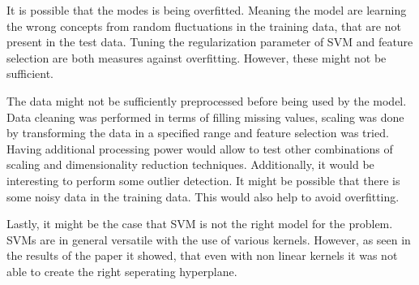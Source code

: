 It is possible that the modes is being overfitted. Meaning the model are learning the wrong concepts from random fluctuations in the training data, that are not present in the test data. Tuning the regularization parameter of SVM and feature selection are both measures against overfitting. However, these might not be sufficient. 

The data might not be sufficiently preprocessed before being used by the model. Data cleaning was performed in terms of filling missing values, scaling was done by transforming the data in a specified range and feature selection was tried. Having additional processing power would allow to test other combinations of scaling and dimensionality reduction techniques. Additionally, it would be interesting to perform some outlier detection. It might be possible that there is some noisy data in the training data. This would also help to avoid overfitting.

Lastly, it might be the case that SVM is not the right model for the problem. SVMs are in general versatile with the use of various kernels. However, as seen in the results of the paper it showed, that even with non linear kernels it was not able to create the right seperating hyperplane. 




